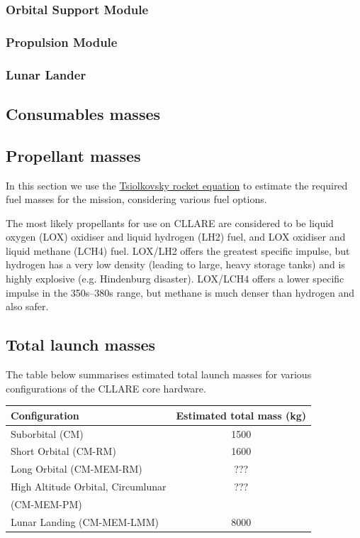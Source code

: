 \documentclass{report}
\begin{document}
\subsubsection{Orbital Support Module}

\subsubsection{Propulsion Module}

\subsubsection{Lunar Lander}

\subsection{Consumables masses}

\subsection{Propellant masses}

In this section we use the \href{http://en.wikipedia.org/wiki/Tsiolkovsky_rocket_equation}{Tsiolkovsky rocket equation} to estimate the required fuel masses for the mission, considering various fuel options.

The most likely propellants for use on CLLARE are considered to be liquid oxygen (LOX) oxidiser and liquid hydrogen (LH2) fuel, and LOX oxidiser and liquid methane (LCH4) fuel.  LOX/LH2 offers the greatest specific impulse, but hydrogen has a very low density (leading to large, heavy storage tanks) and is highly explosive (e.g. Hindenburg disaster).  LOX/LCH4 offers a lower specific impulse in the 350s--380s range, but methane is much denser than hydrogen and also safer.

\subsection{Total launch masses}

The table below summarises estimated total launch masses for various configurations of the CLLARE core hardware.

\begin{tabular}{ | l | c | }
\hline
Configuration & Estimated total mass (kg) \\
\hline
\hline
Suborbital (CM) & 1500 \\
\hline
Short Orbital (CM-RM) & 1600 \\
\hline
Long Orbital (CM-MEM-RM) & ??? \\
\hline
High Altitude Orbital, Circumlunar & ??? \\
(CM-MEM-PM) & \\
\hline
Lunar Landing (CM-MEM-LMM) & 8000 \\
\hline
\end{tabular}
\end{document}
